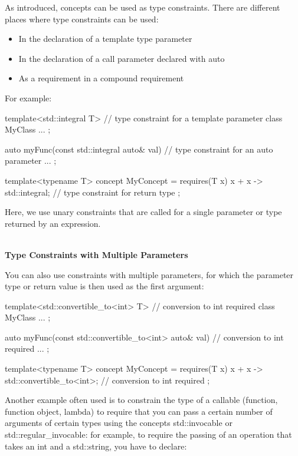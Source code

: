 As introduced, concepts can be used as type constraints. There are different places where type constraints can be used:

\begin{itemize}
\item
In the declaration of a template type parameter

\item
In the declaration of a call parameter declared with auto

\item
As a requirement in a compound requirement
\end{itemize}

For example:

\begin{cpp}
template<std::integral T> // type constraint for a template parameter
class MyClass {
	...
};

auto myFunc(const std::integral auto& val) { // type constraint for an auto parameter
	...
};

template<typename T>
concept MyConcept = requires(T x) {
		{ x + x } -> std::integral; // type constraint for return type
	};
\end{cpp}

Here, we use unary constraints that are called for a single parameter or type returned by an expression.

\noindent
\hspace*{\fill} \\ %
\textbf{Type Constraints with Multiple Parameters}

You can also use constraints with multiple parameters, for which the parameter type or return value is then used as the first argument:

\begin{cpp}
template<std::convertible_to<int> T> // conversion to int required
class MyClass {
	...
};

auto myFunc(const std::convertible_to<int> auto& val) { // conversion to int required
	...
};

template<typename T>
concept MyConcept = requires(T x) {
		{ x + x } -> std::convertible_to<int>; // conversion to int required
	};
\end{cpp}

Another example often used is to constrain the type of a callable (function, function object, lambda) to require that you can pass a certain number of arguments of certain types using the concepts std::invocable or std::regular\_invocable: for example, to require the passing of an operation that takes an int and a std::string, you have to declare:

